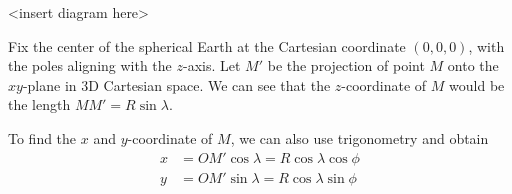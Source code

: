 <insert diagram here>

Fix the center of the spherical Earth at the Cartesian coordinate $(0,0,0)$, with
the poles aligning with the $z$-axis. Let $M'$ be the projection of point $M$ onto
the $xy$-plane in 3D Cartesian space. We can see that the $z$-coordinate of $M$
would be the length $MM'=R\sin\lambda$.

To find the $x$ and $y$-coordinate of $M$, we can also use trigonometry and obtain
\begin{align}
    x&=OM'\cos\lambda=R\cos\lambda\cos\phi\\
    y&=OM'\sin\lambda=R\cos\lambda\sin\phi
\end{align}